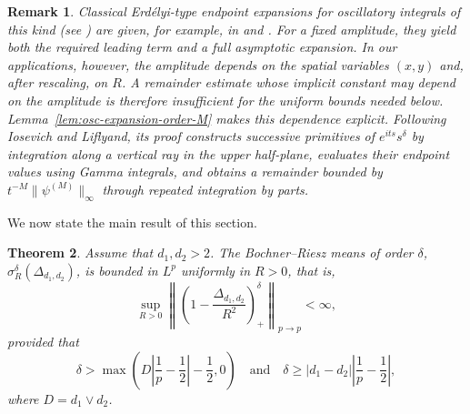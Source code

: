 \documentclass[12pt]{amsart}
\newcommand\Lapd{\Delta_{d_1, d_2}}
\newtheorem{theorem}{Theorem}[section]
\newtheorem{remark}[theorem]{Remark}
\begin{document}
\begin{remark}
Classical Erd\'elyi-type endpoint expansions for oscillatory integrals of this kind (see \cite{Er1956}) are given, for example, in \cite[p.~355, Section~5.1(d)]{Stein} and \cite[Example~7.1.17]{Hormander}. For a fixed amplitude, they yield both the required leading term and a full asymptotic expansion. In our applications, however, the amplitude depends on the spatial variables $(x,y)$ and, after rescaling, on $R$. A remainder estimate whose implicit constant may depend on the amplitude is therefore insufficient for the uniform bounds needed below. Lemma~\ref{lem:osc-expansion-order-M} makes this dependence explicit. Following Iosevich and Liflyand, its proof constructs successive primitives of $e^{its}s^\delta$ by integration along a vertical ray in the upper half-plane, evaluates their endpoint values using Gamma integrals, and obtains a remainder bounded by $t^{-M}\|\psi^{(M)}\|_\infty$ through repeated integration by parts.
\end{remark}



We now state the main result of this section.

\begin{theorem}\label{thm:BRR}
Assume that $d_1,d_2>2$.
The Bochner--Riesz means of order $\delta$, $\sigma_{R}^\delta(\Lapd)$, is bounded in $L^p$ uniformly in $R>0$, that is,
\begin{equation*}
    \sup_{R>0}\left\|\left(1-\frac{\Lapd}{R^2}\right)_+^\delta\right\|_{p\to p}<\infty,
\end{equation*}
provided that
\begin{equation}\label{BRrange}
\delta>\max\left(D\left|\frac1p-\frac12\right|-\frac12,0\right)
\quad\text{and}\quad
\delta \ge |d_1-d_2|\left|\frac1p-\frac12\right|,
\tag{9}
\end{equation}
where \(D=d_1\vee d_2\).
\end{theorem}
\end{document}

